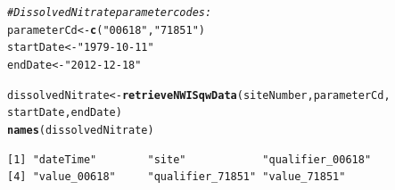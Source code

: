 \documentclass[a4paper,11pt]{article}\usepackage[]{graphicx}\usepackage[]{color}
\makeatletter
\newcommand{\hlstr}[1]{\textcolor[rgb]{0.192,0.494,0.8}{#1}}%
\newcommand{\hlcom}[1]{\textcolor[rgb]{0.678,0.584,0.686}{\textit{#1}}}%
\newcommand{\hlstd}[1]{\textcolor[rgb]{0.345,0.345,0.345}{#1}}%
\newcommand{\hlkwb}[1]{\textcolor[rgb]{0.69,0.353,0.396}{#1}}%
\newcommand{\hlkwd}[1]{\textcolor[rgb]{0.737,0.353,0.396}{\textbf{#1}}}%
\newenvironment{kframe}{%
 \def\at@end@of@kframe{}%
 \ifinner\ifhmode%
  \def\at@end@of@kframe{\end{minipage}}%
  \begin{minipage}{\columnwidth}%
 \fi\fi%
 \def\FrameCommand##1{\hskip\@totalleftmargin \hskip-\fboxsep
 \colorbox{shadecolor}{##1}\hskip-\fboxsep
     \hskip-\linewidth \hskip-\@totalleftmargin \hskip\columnwidth}%
 \MakeFramed {\advance\hsize-\width
   \@totalleftmargin\z@ \linewidth\hsize
   \@setminipage}}%
 {\par\unskip\endMakeFramed%
 \at@end@of@kframe}
\newenvironment{knitrout}{}{} %
\makeatother
\begin{document}
\begin{knitrout}
\color{fgcolor}\begin{kframe}
\begin{alltt}
\hlcom{# Dissolved Nitrate parameter codes:}
\hlstd{parameterCd} \hlkwb{<-} \hlkwd{c}\hlstd{(}\hlstr{"00618"}\hlstd{,}\hlstr{"71851"}\hlstd{)}
\hlstd{startDate} \hlkwb{<-} \hlstr{"1979-10-11"}
\hlstd{endDate} \hlkwb{<-} \hlstr{"2012-12-18"}

\hlstd{dissolvedNitrate} \hlkwb{<-} \hlkwd{retrieveNWISqwData}\hlstd{(siteNumber, parameterCd,}
      \hlstd{startDate, endDate)}
\hlkwd{names}\hlstd{(dissolvedNitrate)}
\end{alltt}
\begin{verbatim}
[1] "dateTime"        "site"            "qualifier_00618"
[4] "value_00618"     "qualifier_71851" "value_71851"    
\end{verbatim}
\end{kframe}
\end{knitrout}

\end{document}
